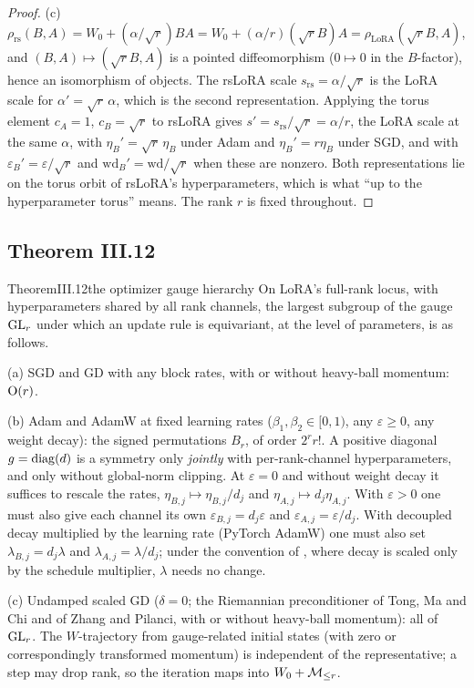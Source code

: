 \begin{proof}
(c) $\rho_{\mathrm{rs}}(B,A)=W_0+(\alpha/\sqrt r)BA=W_0+(\alpha/r)(\sqrt rB)A=\rho_{\mathrm{LoRA}}(\sqrt rB,A)$, and
$(B,A)\mapsto(\sqrt rB,A)$ is a pointed diffeomorphism ($0\mapsto0$ in the $B$-factor), hence an isomorphism of objects.
The rsLoRA scale $s_{\mathrm{rs}}=\alpha/\sqrt r$ is the LoRA scale for $\alpha'=\sqrt r\,\alpha$, which is the second
representation. Applying the torus element $c_A=1$, $c_B=\sqrt r$ to rsLoRA gives $s'=s_{\mathrm{rs}}/\sqrt r=\alpha/r$,
the LoRA scale at the same $\alpha$, with $\eta_B'=\sqrt r\,\eta_B$ under Adam and $\eta_B'=r\eta_B$ under SGD, and with
$\varepsilon_B'=\varepsilon/\sqrt r$ and $\mathrm{wd}_B'=\mathrm{wd}/\sqrt r$ when these are nonzero. Both representations
lie on the torus orbit of rsLoRA's hyperparameters, which is what ``up to the hyperparameter torus'' means. The rank $r$
is fixed throughout.
\end{proof}

\subsection{Theorem III.12}\label{proof:III.12}

\begin{restate}{Theorem}{III.12}{the optimizer gauge hierarchy}
On LoRA's full-rank locus, with hyperparameters shared by all rank channels, the largest subgroup of the gauge $\mathrm{GL}_r$
under which an update rule is equivariant, at the level of parameters, is as follows.

(a) SGD and GD with any block rates, with or without heavy-ball momentum: $\mathrm{O}(r)$.

(b) Adam and AdamW at fixed learning rates ($\beta_1,\beta_2\in[0,1)$, any $\varepsilon\ge0$, any weight decay): the
signed permutations $B_r$, of order $2^rr!$. A positive diagonal $g=\operatorname{diag}(d)$ is a symmetry only \emph{jointly} with
per-rank-channel hyperparameters, and only without global-norm clipping. At $\varepsilon=0$ and without weight decay it
suffices to rescale the rates, $\eta_{B,j}\mapsto\eta_{B,j}/d_j$ and $\eta_{A,j}\mapsto d_j\eta_{A,j}$. With
$\varepsilon>0$ one must also give each channel its own $\varepsilon_{B,j}=d_j\varepsilon$ and
$\varepsilon_{A,j}=\varepsilon/d_j$. With decoupled decay multiplied by the learning rate (PyTorch AdamW) one must also
set $\lambda_{B,j}=d_j\lambda$ and $\lambda_{A,j}=\lambda/d_j$; under the convention of \citet{xloshchilov2019decoupled},
where decay is scaled only by the schedule multiplier, $\lambda$ needs no change.

(c) Undamped scaled GD ($\delta=0$; the Riemannian preconditioner of Tong, Ma and Chi and of Zhang and Pilanci, with or
without heavy-ball momentum): all of $\mathrm{GL}_r$. The $W$-trajectory from gauge-related initial states (with zero or
correspondingly transformed momentum) is independent of the representative; a step may drop rank, so the iteration maps
into $W_0+\mathcal{M}_{\le r}$.
\end{restate}

